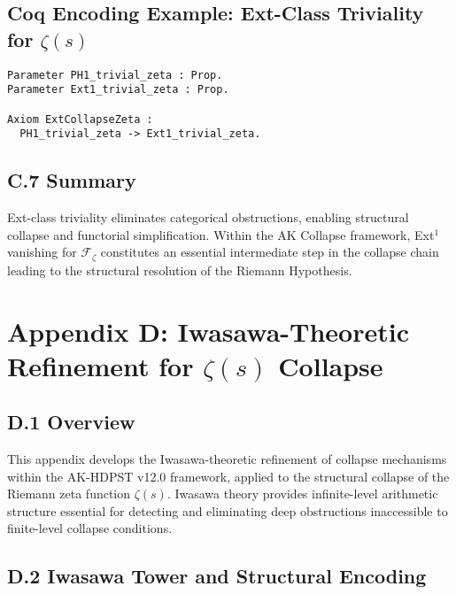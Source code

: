 \documentclass[11pt]{article}
\begin{document}
\subsection*{Coq Encoding Example: Ext-Class Triviality for $\zeta(s)$}

\begin{lstlisting}[language=Coq, caption=Coq Formalization of Ext-Class Triviality for $\zeta(s)$, captionpos=b]
Parameter PH1_trivial_zeta : Prop.
Parameter Ext1_trivial_zeta : Prop.

Axiom ExtCollapseZeta :
  PH1_trivial_zeta -> Ext1_trivial_zeta.
\end{lstlisting}

\subsection*{C.7 Summary}

Ext-class triviality eliminates categorical obstructions, enabling structural collapse and functorial simplification. Within the AK Collapse framework, Ext$^1$ vanishing for $\mathcal{F}_{\zeta}$ constitutes an essential intermediate step in the collapse chain leading to the structural resolution of the Riemann Hypothesis.



\section*{Appendix D: Iwasawa-Theoretic Refinement for $\zeta(s)$ Collapse}

\subsection*{D.1 Overview}

This appendix develops the Iwasawa-theoretic refinement of collapse mechanisms within the AK-HDPST v12.0 framework, applied to the structural collapse of the Riemann zeta function $\zeta(s)$. Iwasawa theory provides infinite-level arithmetic structure essential for detecting and eliminating deep obstructions inaccessible to finite-level collapse conditions.

\subsection*{D.2 Iwasawa Tower and Structural Encoding}
\end{document}
